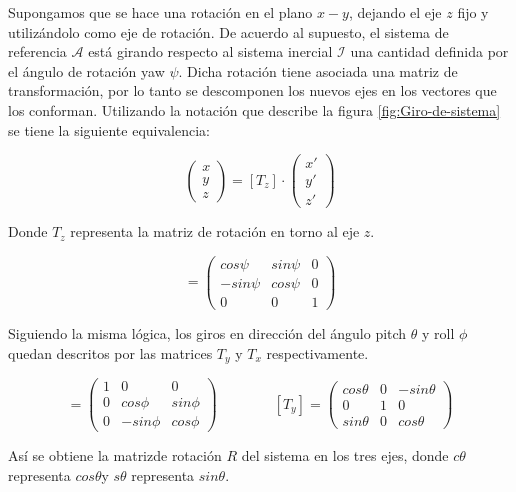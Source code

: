 \documentclass[\main/main.tex]{subfiles}
\begin{document}
Supongamos que se hace una rotación en el plano $x-y$, dejando el
eje $z$ fijo y utilizándolo como eje de rotación. De acuerdo al supuesto,
el sistema de referencia $\mathcal{A}$ está girando respecto al sistema
inercial $\mathcal{I}$ una cantidad definida por el ángulo de rotación
yaw $\psi$. Dicha rotación tiene asociada una matriz de transformación, por lo tanto se descomponen los nuevos
ejes en los vectores que los conforman. Utilizando la notación que
describe la figura \ref{fig:Giro-de-sistema} se tiene la siguiente
equivalencia:

\begin{equation}
\begin{pmatrix}x\\
y\\
z
\end{pmatrix}=[T_{z}]\cdot\begin{pmatrix}x'\\
y'\\
z'
\end{pmatrix}
\end{equation}

Donde $T_{z}$ representa la matriz de rotación en torno al eje $z$. 

\begin{equation}
[T_{z}]=\begin{pmatrix}cos\psi & sin\psi & 0\\
-sin\psi & cos\psi & 0\\
0 & 0 & 1
\end{pmatrix}
\end{equation}

Siguiendo la misma lógica, los giros en dirección del ángulo pitch
$\theta$ y roll $\phi$ quedan descritos por las matrices $T_{y}$
y $T_{x}$ respectivamente.

\begin{equation}
[T_{x}]=\begin{pmatrix}1 & 0 & 0\\
0 & cos\phi & sin\phi\\
0 & -sin\phi & cos\phi
\end{pmatrix}\qquad\qquad[T_{y}]=\begin{pmatrix}cos\theta & 0 & -sin\theta\\
0 & 1 & 0\\
sin\theta & 0 & cos\theta
\end{pmatrix}
\end{equation}

Así se obtiene la matrizde rotación $R$ del sistema en los tres ejes,
donde $c\theta$ representa $cos\theta$y $s\theta$ representa $sin\theta$.
\end{document}
